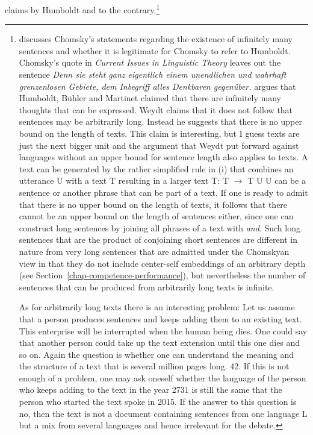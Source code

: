 claims by Humboldt and \citet[]{Chomsky2008a} to the contrary.\footnote{%
  \citet{Weydt72a} discusses Chomsky's statements regarding the existence of infinitely many
  sentences and whether it is legitimate for Chomsky to refer to Humboldt. Chomsky's quote in
  \emph{Current Issues in Linguistic Theory} \citep[]{Chomsky70b-ut} leaves out the sentence \emph{Denn sie steht ganz eigentlich einem unendlichen und
    wahrhaft grenzenlosen Gebiete, dem Inbegriff alles Denkbaren gegenüber.} \citet[]{Weydt72a} argues that
  Humboldt, Bühler and Martinet claimed that
  there are infinitely many thoughts that can be expressed. Weydt
  claims that it does not follow that sentences may be arbitrarily long. Instead he suggests that
  there is no upper bound on the length of texts. This claim is interesting, but I guess texts are
  just the next bigger unit and the argument that Weydt put forward against languages without an
  upper bound for sentence length also applies to texts. A text can be generated by the rather
  simplified rule in (i) that combines an utterance U with a text T resulting in a larger text T:
  \ea
  T $\to$ T U
  \z
  U can be a sentence or another phrase that can be part of a text. If one is ready to admit that
  there is no upper bound on the length of texts, it follows that there cannot be an upper bound on
  the length of sentences either, since one can construct long sentences by joining all phrases of a
  text with \emph{and}. Such long sentences that are the product of conjoining short sentences are different in nature from very long sentences that are admitted under the
  Chomskyan view in that they do not include center-self embeddings of an
  arbitrary depth (see Section~\ref{chap-competence-performance}), but nevertheless the number of
  sentences that can be produced from arbitrarily long texts is infinite.

  As for arbitrarily long texts there is an interesting problem: Let us assume that a person
  produces sentences and keeps adding them to an existing text. This enterprise will be interrupted
  when the human being dies. One could say that another person could take up the text extension
  until this one dies and so on. Again the question is whether one can understand the meaning and the structure
  of a text that is several million pages long. 42. If this is not enough of a problem, one may ask
  oneself whether the language of the person who keeps adding to the text in the year 2731 is still
  the same that the person who started the text spoke in 2015. If the answer to this question is no,
  then the text is not a document containing sentences from one language L but a mix from several
  languages and hence irrelevant for the debate. 
} 

